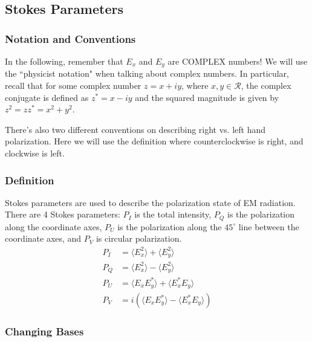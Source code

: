 \documentclass{article}
\begin{document}
\subsection{Stokes Parameters}
\subsubsection{Notation and Conventions}

In the following, remember that $E_x$ and $E_y$ are COMPLEX numbers! We will use the ``physicist notation" when talking about complex numbers. In particular, recall that for some complex number $z = x + iy$, where $x,y \in \mathcal{R}$, the complex conjugate is defined as $z^* = x - iy$ and the squared magnitude is given by $z^2 = z z^* = x^2 + y^2$.

There's also two different conventions on describing right vs. left hand polarization. Here we will use the definition where counterclockwise is right, and clockwise is left.

\subsubsection{Definition}

Stokes parameters are used to describe the polarization state of EM radiation. There are 4 Stokes parameters: $P_I$ is the total intensity, $P_Q$ is the polarization along the coordinate axes, $P_U$ is the polarization along the $45^\circ$ line between the coordinate axes, and $P_V$ is circular polarization.
\begin{align}
    P_I &= \langle E_x^2 \rangle + \langle E_y^2 \rangle \\
    P_Q &= \langle E_x^2 \rangle - \langle E_y^2 \rangle \\
    P_U &= \langle E_x E_y^* \rangle + \langle E_x^* E_y \rangle \\
    P_V &= i (\langle E_x E_y^* \rangle - \langle E_x^* E_y \rangle )
\end{align}

\subsubsection{Changing Bases}
\end{document}

